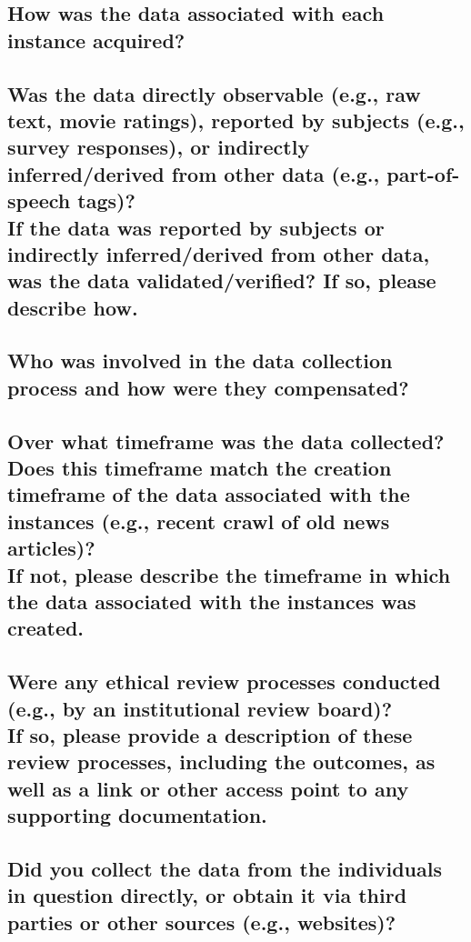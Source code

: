 \documentclass[letterpaper, 10 pt, conference]{ieeeconf}  %
\newcommand{\subtitle}[1]{{\\ \small \normalfont \color{purple} #1}}
\begin{document}
\subsection{How was the data associated with each instance acquired?}

\lipsum[1]

\subsection{Was the data directly observable (e.g., raw text, movie ratings), reported by subjects (e.g., survey responses), or indirectly inferred/derived from other data (e.g., part-of-speech tags)? \subtitle{If the data was reported by subjects or indirectly inferred/derived from other data, was the data validated/verified? If so, please describe how.}}

\lipsum[1]

\subsection{Who was involved in the data collection process and how were they compensated?}

\lipsum[1]

\subsection{Over what timeframe was the data collected? Does this timeframe match the creation timeframe of the data associated with the instances (e.g., recent crawl of old news articles)? \subtitle{If not, please describe the timeframe in which the data associated with the instances was created.}}

\lipsum[1]

\subsection{Were any ethical review processes conducted (e.g., by an institutional review board)? \subtitle{If so, please provide a description of these review processes, including the outcomes, as well as a link or other access point to any supporting documentation.}}

\lipsum[1]

\subsection{Did you collect the data from the individuals in question directly, or obtain it via third parties or other sources (e.g., websites)?}
\end{document}
